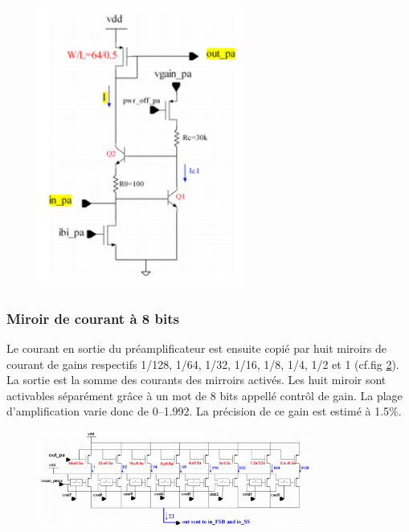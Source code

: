 \begin{figure}[th!]
	\centering
	\includegraphics[width=0.60\textwidth]{GLA/preampli.png}
	\label{preampli}
\end{figure}

\subsubsection{Miroir de courant à 8 bits}
Le courant en sortie du préamplificateur est ensuite copié par huit miroirs de courant de gains respectifs 1/128, 1/64, 1/32, 1/16, 1/8, 1/4, 1/2 et 1 (cf.fig \ref{mirror}). La sortie est la somme des courants des mirroirs activés. Les huit miroir sont activables séparément grâce à un mot de \num{8} bits appellé contrôl de gain. La plage d'amplification varie donc de \SIrange{0}{1.992}{}. La précision de ce gain est estimé à 1.5\%. 

\begin{figure}[ht!]
	\centering
	\includegraphics[width=0.8\textwidth]{GLA/miror.png}
	\label{mirror}
\end{figure}


